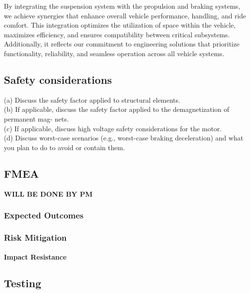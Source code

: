 By integrating the suspension system with the propulsion and braking systems, we achieve synergies that enhance overall vehicle performance, handling, and ride comfort. This integration optimizes the utilization of space within the vehicle, maximizes efficiency, and ensures compatibility between critical subsystems. Additionally, it reflects our commitment to engineering solutions that prioritize functionality, reliability, and seamless operation across all vehicle systems.

\subsection{Safety considerations }
(a) Discuss the safety factor applied to structural elements. \\
(b) If applicable, discuss the safety factor applied to the demagnetization of permanent mag-
nets.\\
(c) If applicable, discuss high voltage safety considerations for the motor.\\
(d) Discuss worst-case scenarios (e.g., worst-case braking deceleration) and what you plan
to do to avoid or contain them.\\

\subsection{FMEA}
\textbf{WILL BE DONE BY PM}

\subsubsection{Expected Outcomes}


\subsubsection{Risk Mitigation}


\paragraph{Impact Resistance}



\subsection{Testing}


\newpage

